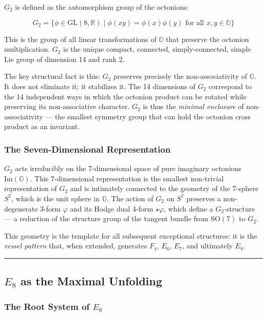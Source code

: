 \documentclass[12pt,a4paper]{article}
\begin{document}
$G_2$ is defined as the automorphism group of the octonions:

\[G_2 = \{ \phi \in \text{GL}(8,\mathbb{R}) \mid \phi(xy) = \phi(x)\phi(y) \text{ for all } x,y \in \mathbb{O} \}\]

This is the group of all linear transformations of $\mathbb{O}$ that preserve the octonion multiplication. $G_2$ is the unique compact, connected, simply-connected, simple Lie group of dimension 14 and rank 2.

The key structural fact is this: $G_2$ preserves precisely the non-associativity of $\mathbb{O}$. It does not eliminate it; it stabilizes it. The 14 dimensions of $G_2$ correspond to the 14 independent ways in which the octonion product can be rotated while preserving its non-associative character. $G_2$ is thus the \emph{minimal enclosure} of non-associativity --- the smallest symmetry group that can hold the octonion cross product as an invariant.

\subsubsection{The Seven-Dimensional Representation}

$G_2$ acts irreducibly on the 7-dimensional space of pure imaginary octonions $\text{Im}(\mathbb{O})$. This 7-dimensional representation is the smallest non-trivial representation of $G_2$ and is intimately connected to the geometry of the 7-sphere $S^7$, which is the unit sphere in $\mathbb{O}$. The action of $G_2$ on $S^7$ preserves a non-degenerate 3-form $\varphi$ and its Hodge dual 4-form $\star\varphi$, which define a $G_2$-structure --- a reduction of the structure group of the tangent bundle from $\text{SO}(7)$ to $G_2$.

This geometry is the template for all subsequent exceptional structures: it is the \emph{vessel pattern} that, when extended, generates $F_4$, $E_6$, $E_7$, and ultimately $E_8$.

\begin{center}
\rule{0.5\textwidth}{0.4pt}
\end{center}

\subsection{$E_8$ as the Maximal Unfolding}

\subsubsection{The Root System of $E_8$}
\end{document}
